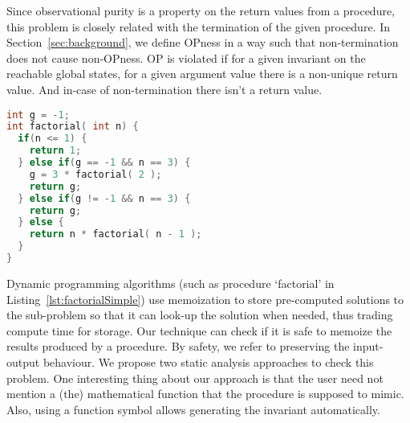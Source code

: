 \documentclass{llncs}
\begin{document}
  

Since observational purity is a property on the return values from a
procedure, this problem is closely related with the termination of the
given procedure. In Section~\ref{sec:background}, we define OPness in
a way such that non-termination does not cause non-OPness. OP is
violated if for a given invariant on the reachable global states, for
a given argument value there is a non-unique return value. And in-case
of non-termination there isn't a return value.

\begin{lstlisting}[language=c, caption= {Procedure `factorial' :
      returns factorial of `n' and memoizes result for argument value
      `3'.}, label=lst:factorialSimple]
int g = -1;
int factorial( int n) {
  if(n <= 1) {
    return 1;
  } else if(g == -1 && n == 3) {
    g = 3 * factorial( 2 );
    return g;
  } else if(g != -1 && n == 3) {
    return g;
  } else {
    return n * factorial( n - 1 );
  }
}
\end{lstlisting}


Dynamic programming algorithms (such as procedure `factorial' in
Listing~\ref{lst:factorialSimple}) use memoization to store
pre-computed solutions to the sub-problem so that it can look-up the
solution when needed, thus trading compute time for storage. Our
technique can check if it is safe to memoize the results produced by a
procedure. By safety, we refer to preserving the input-output
behaviour. We propose two static analysis approaches to check this
problem. One interesting thing about our approach is that the user
need not mention a (the) mathematical function that the procedure is
supposed to mimic. Also, using a function symbol allows generating the
invariant automatically.

\end{document}

